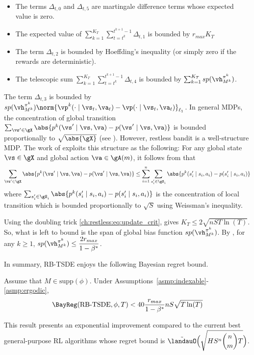 \begin{itemize}
    \item The terms $\Delta_{t,0}$ and $\Delta_{t,5}$ are martingale difference terms whose expected value is zero.
    \item The expected value of $\sum_{k=1}^{K_T}\sum_{t=t^k}^{t^{k+1}-1}\Delta_{t,1}$ is bounded by $r_{max} K_T$ \cite[Appendix~A.2]{akbarzadeh2022learning}
    \item The term $\Delta_{t,2}$ is bounded by Hoeffding's inequality (or simply zero if the rewards are deterministic).
    \item The telescopic sum $\sum_{k=1}^{K_T}\sum_{t=t^k}^{t^{k+1}-1} \Delta_{t,4}$ is bounded by $\sum_{k=1}^{K_T} sp(\vh^{\pi^k}_{M^k})$.
\end{itemize}

The term $\Delta_{t,3}$ is bounded by $sp(\vh^{\pi^k}_{M^k})\norm{\vp^k(\cdot\mid \vs_t,\va_t)-\vp(\cdot\mid \vs_t,\va_t)}_{\ell_1}$.
In general MDPs, the concentration of global transition $\sum_{\vs'\in\gX} \abs{p^k(\vs'\mid \vs,\va) -p(\vs'\mid \vs,\va)}$ is bounded proportionally to $\sqrt{\abs{\gX}}$ (see \cite{qian2020concentration}).
However, restless bandit is a well-structure MDP.
The work of \cite{akbarzadeh2022learning} exploits this structure as the following:
For any global state $\vs\in\gX$ and global action $\va\in\gA(m)$, it follows from \cite[Lemma~13]{jung2019thompson} that
\begin{align*}
    \sum_{\vs'\in\gX} \abs{p^k(\vs'\mid \vs,\va) -p(\vs'\mid \vs,\va)}
    \le \sum_{i=1}^{n} \sum_{s'_i\in\gS_i} \abs{p^k(s'_i\mid s_i,a_i) -p(s'_i\mid s_i,a_i)}
\end{align*}
where $\sum_{s'_i\in\gS_i} \abs{p^k(s'_i\mid s_i,a_i) -p(s'_i\mid s_i,a_i)}$ is the concentration of local transition which is bounded proportionally to $\sqrt{S}$ using Weissman's inequality.

Using the doubling trick \eqref{ch:restless:eq:update_crit}, \cite[Lemma~A.1]{akbarzadeh2022learning} gives $K_T\le2\sqrt{nST\ln(T)}$. So, what is left to bound is the span of global bias function $sp(\vh^{\pi^k}_{M^k})$.
By \cite[Lemma~5.1]{akbarzadeh2022learning}, for any $k\ge1$, $sp(\vh^{\pi^k}_{M^k})\le \displaystyle\frac{2r_{max}}{1-\beta^*}$.

In summary, RB-TSDE \cite{akbarzadeh2022learning} enjoys the following Bayesian regret bound.
\begin{prop}
    Assume that $M\in\mathrm{supp}(\phi)$.
Under Assumptions~\ref{asmp:indexable}-\ref{asmp:ergodic}, 
    \begin{equation}
        \label{eq:rb_tsde_rg}
        \BayReg(\textnormal{RB-TSDE},\phi,T) < 40\frac{r_{max}}{1-\beta^*}nS\sqrt{T\ln(T)}
    \end{equation}
\end{prop}
This result presents an exponential improvement compared to the current best general-purpose RL algorithms whose regret bound is $\tilde{\landauO}\displaystyle\Bigl(\sqrt{HS^n{n \choose m}T}\Bigr)$.

